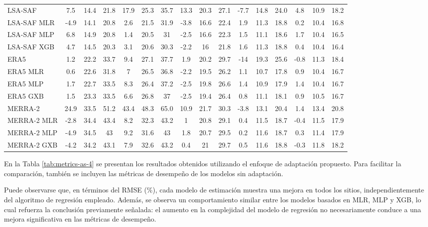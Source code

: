 \begin{table}
{\begin{tabular}{|l|ccc|ccc|ccc|ccc|ccc|}
      LSA-SAF        & 7.5  & 14.4 & 21.8 & 17.9 & 25.3 & 35.7 & 13.3 & 20.3 & 27.1 & -7.7  & 14.8 & 24.0 & 4.8  & 10.9 & 18.2 \\
      LSA-SAF MLR    & -4.9 & 14.1 & 20.8 & 2.6 & 21.5 & 31.9 & -3.8 & 16.6 & 22.4 & 1.9 & 11.3 & 18.8 & 0.2 & 10.4 & 16.8\\ 
      LSA-SAF MLP    & 6.8  & 14.9 & 20.8 & 1.4 & 20.5 & 31   & -2.5 & 16.6 & 22.3 & 1.5 & 11.1 & 18.6 & 1.7 & 10.4 & 16.5\\ 
	  LSA-SAF XGB    & 4.7  & 14.5 & 20.3 & 3.1 & 20.6 & 30.3 & -2.2 & 16   & 21.8 & 1.6 & 11.3 & 18.8 & 0.4 & 10.4 & 16.4\\
	  \hline
	  ERA5          & 1.2  & 22.2 & 33.7 & 9.4 & 27.1 & 37.7 & 1.9  & 20.2 & 29.7 & -14 & 19.3 & 25.6 & -0.8 & 11.3 & 18.4 \\
      ERA5 MLR      & 0.6  & 22.6 & 31.8 & 7   & 26.5 & 36.8 & -2.2 & 19.5 & 26.2 & 1.1 & 10.7 & 17.8 & 0.9  & 10.4 & 16.7 \\
      ERA5 MLP      & 1.7  & 22.7 & 33.5 & 8.3 & 26.4 & 37.2 & -2.5 & 19.8 & 26.6 & 1.4 & 10.9 & 17.9 & 1.4  & 10.4 & 16.7  \\
	  ERA5 GXB      & 1.5  & 23.3 & 33.5 & 6.6 & 26.8 & 37   & -2.5 & 19.4 & 26.4 & 0.8 & 11.1 & 18.1 & 0.9  & 10.5 & 16.7\\
      \hline	
	  MERRA-2       & 24.9 & 33.5 & 51.2 & 43.4 & 48.3 & 65.0 & 10.9 & 21.7 & 30.3 & -3.8  & 13.1 & 20.4 & 1.4  & 13.4 & 20.8 \\
      MERRA-2 MLR   & -2.8 & 34.4 & 43.4 & 8.2 & 32.3 & 43.2 & 1   & 20.8 & 29.1 & 0.4 & 11.5 & 18.7 & -0.4 & 11.5 & 17.9\\
      MERRA-2 MLP   & -4.9 & 34.5 & 43   & 9.2 & 31.6 & 43   & 1.8 & 20.7 & 29.5 & 0.2 & 11.6 & 18.7 &  0.3 & 11.4 & 17.9\\
	  MERRA-2 GXB   & -4.2 & 34.2 & 43.1 & 7.9 & 32.6 & 43.2 & 0.4  & 21   & 29.7   & 0.5   & 11.6    & 18.8    & -0.3 & 11.8 & 18.2 \\
      \hline	
    \end{tabular}%
  }
\end{table}


En la Tabla \ref{tab:metrics-as-4} se presentan los resultados obtenidos utilizando el enfoque de adaptación propuesto. Para facilitar la comparación, también se incluyen las métricas de desempeño de los modelos sin adaptación.

Puede observarse que, en términos del RMSE (\%), cada modelo de estimación muestra una mejora en todos los sitios, independientemente del algoritmo de regresión empleado. Además, se observa un comportamiento similar entre los modelos basados en MLR, MLP y XGB, lo cual refuerza la conclusión previamente señalada: el aumento en la complejidad del modelo de regresión no necesariamente conduce a una mejora significativa en las métricas de desempeño.



